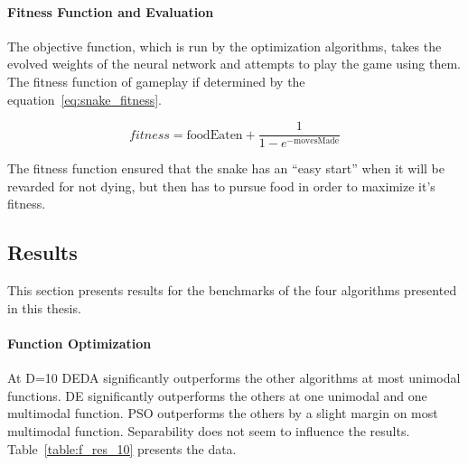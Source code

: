 \paragraph{Fitness Function and Evaluation}

The objective function, which is run by the optimization algorithms, takes the evolved weights of the neural network and attempts to play the game using them. The fitness function of gameplay if determined by the equation~\ref{eq:snake_fitness}.

\begin{equation} \label{eq:snake_fitness}
  fitness = \text{foodEaten} + \frac{1}{1-e^{-\text{movesMade}}}
\end{equation}

The fitness function ensured that the snake has an ``easy start'' when it will be revarded for not dying, but then has to pursue food in order to maximize it's fitness.

\subsection{Results}

This section presents results for the benchmarks of the four algorithms presented in this thesis.

\paragraph{Function Optimization}
At D=10 DEDA significantly outperforms the other algorithms at most unimodal functions. DE significantly outperforms the others at one unimodal and one multimodal function. PSO outperforms the others by a slight margin on most multimodal function. Separability does not seem to influence the results. Table~\ref{table:f_res_10} presents the data.

